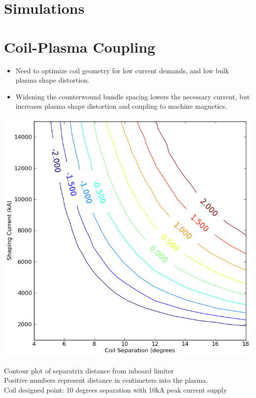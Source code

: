 \documentclass{article}
\begin{document}
\begin{multicols}{5}
\section{Simulations}

\section*{Coil-Plasma Coupling}

\begin{itemize}
\item Need to optimize coil geometry for low current demands, and low bulk plasma shape distortion.  
\item Widening the counterwound bundle spacing lowers the necessary current, but increases plasma shape distortion and coupling to machine magnetics.\\
\end{itemize}

\includegraphics[width=0.9\columnwidth]{diversion_currents}

\begin{center}Contour plot of separatrix distance from inboard limiter\\ Positive numbers represent distance in centimeters into the plasma.\\Coil designed point: 10 degrees separation with 10kA peak current supply\\\end{center}


\end{multicols}
\end{document}
